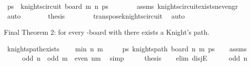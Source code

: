 \begin{isabellebody}
\ ps\ \ {\isachardoublequoteopen}knights{\isacharunderscore}{\kern0pt}circuit\ {\isacharparenleft}{\kern0pt}board\ m\ n{\isacharparenright}{\kern0pt}\ ps{\isachardoublequoteclose}\isanewline
\ \ \ \ \ \ \isamarkupfalse%
\ assms\ knights{\isacharunderscore}{\kern0pt}circuit{\isacharunderscore}{\kern0pt}exists{\isacharunderscore}{\kern0pt}n{\isacharunderscore}{\kern0pt}even{\isacharunderscore}{\kern0pt}gr{\isacharunderscore}{\kern0pt}{}{}\ \isamarkupfalse%
\ auto\isanewline
\ \ \ \ \isamarkupfalse%
\ \isamarkupfalse%
\ {\isacharquery}{\kern0pt}thesis\isanewline
\ \ \ \ \ \ \isamarkupfalse%
\ transpose{\isacharunderscore}{\kern0pt}knights{\isacharunderscore}{\kern0pt}circuit\ \isamarkupfalse%
\ auto\isanewline
\ \ \isamarkupfalse%
\isanewline
{}\isamarkupfalse%
%
\endisatagproof
{\isafoldproof}%
%
\isadelimproof
%
\endisadelimproof
%
\begin{isamarkuptext}%
Final Theorem 2: for every -board with  there exists a Knight's path.%
\end{isamarkuptext}\isamarkuptrue%
\isamarkupfalse%
\ knights{\isacharunderscore}{\kern0pt}path{\isacharunderscore}{\kern0pt}exists{\isacharcolon}{\kern0pt}\ \isanewline
\ \ \ {\isachardoublequoteopen}min\ n\ m\ {\isasymge}\ {}{\isachardoublequoteclose}\isanewline
\ \ \ {\isachardoublequoteopen}{\isasymexists}ps{\isachardot}{\kern0pt}\ knights{\isacharunderscore}{\kern0pt}path\ {\isacharparenleft}{\kern0pt}board\ n\ m{\isacharparenright}{\kern0pt}\ ps{\isachardoublequoteclose}\isanewline
%
\isadelimproof
\ \ %
\endisadelimproof
%
\isatagproof
{}\isamarkupfalse%
\ assms\isanewline
{}\isamarkupfalse%
\ {\isacharminus}{\kern0pt}\isanewline
\ \ \isamarkupfalse%
\ {\isachardoublequoteopen}odd\ n\ {\isasymor}\ odd\ m\ {\isasymor}\ even\ {\isacharparenleft}{\kern0pt}n{\isacharasterisk}{\kern0pt}m{\isacharparenright}{\kern0pt}{\isachardoublequoteclose}\ \isamarkupfalse%
\ simp\isanewline
\ \ \isamarkupfalse%
\ \isamarkupfalse%
\ {\isacharquery}{\kern0pt}thesis\isanewline
\ \ \isamarkupfalse%
\ {\isacharparenleft}{\kern0pt}elim\ disjE{\isacharparenright}{\kern0pt}\isanewline
\ \ \ \ \isamarkupfalse%
\ {\isachardoublequoteopen}odd\ n{\isachardoublequoteclose}\isanewline

\end{isabellebody}
